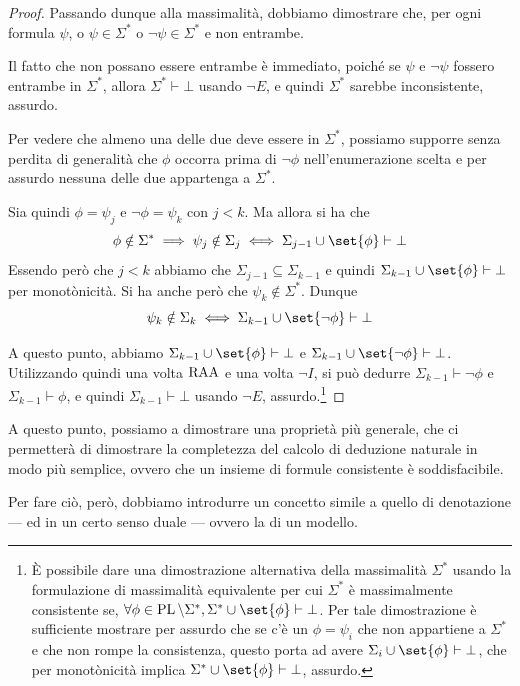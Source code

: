 \begin{proof}
  Passando dunque alla massimalità, dobbiamo dimostrare che, per ogni formula \(\psi\), o \(\psi\in\Sigma^*\) o \(\neg\psi\in\Sigma^*\) e non entrambe.

  Il fatto che non possano essere entrambe è immediato, poiché se \(\psi\) e \(\neg\psi\) fossero entrambe in \(\Sigma^*\), allora \(\Sigma^*\vdash\bot\) usando \(\neg E\), e quindi \(\Sigma^*\) sarebbe inconsistente, assurdo.

  Per vedere che almeno una delle due deve essere in \(\Sigma^*\), possiamo supporre senza perdita di generalità che \(\phi\) occorra prima di \(\neg\phi\) nell'enumerazione scelta e 
  per assurdo nessuna delle due appartenga a \(\Sigma^*\).

  Sia quindi \(\phi=\psi_j\) e \(\neg\phi=\psi_k\) con \(j<k\).
  Ma allora si ha che
  \[\phi\notin\Sigma^* \implies \psi_j \notin \Sigma_j \iff \Sigma_{j-1}\cup\set{\phi} \vdash \bot\]
  Essendo però che \(j<k\) abbiamo che \(\Sigma_{j-1}\subseteq\Sigma_{k-1}\) e quindi \(\Sigma_{k-1}\cup\set{\phi} \vdash \bot\) per monotònicità.
  Si ha anche però che \(\psi_k\notin\Sigma^*\). Dunque
  \[\psi_k \notin \Sigma_k \iff \Sigma_{k-1}\cup\set{\neg\phi}\vdash \bot\]

  A questo punto, abbiamo \(\Sigma_{k-1}\cup\set{\phi}\vdash\bot\) e \(\Sigma_{k-1}\cup\set{\neg\phi}\vdash\bot\). Utilizzando quindi una volta \(\operatorname{RAA}\) e una volta \(\neg I\), si può dedurre \(\Sigma_{k-1}\vdash\neg\phi\) e \(\Sigma_{k-1}\vdash\phi\), e quindi \(\Sigma_{k-1}\vdash\bot\) usando \(\neg E\), assurdo.\footnote{È possibile dare una dimostrazione alternativa della massimalità \(\Sigma^*\) usando la formulazione di massimalità equivalente per cui \(\Sigma^*\) è massimalmente consistente se, \(\forall \phi \in \PL\setminus\Sigma^*, \Sigma^*\cup\set{\phi}\vdash\bot\).
  Per tale dimostrazione è sufficiente mostrare per assurdo che se c'è un \(\phi=\psi_i\) che non appartiene a \(\Sigma^*\) e che non rompe la consistenza, questo porta ad avere \(\Sigma_i\cup\set{\phi}\vdash\bot\), che per monotònicità implica \(\Sigma^*\cup\set{\phi}\vdash\bot\), assurdo.}
\end{proof}

A questo punto, possiamo a dimostrare una proprietà più generale, che ci permetterà di dimostrare la completezza del calcolo di deduzione naturale in modo più semplice, ovvero che un insieme di formule consistente è soddisfacibile.

Per fare ciò, però, dobbiamo introdurre un concetto simile a quello di denotazione --- ed in un certo senso duale --- ovvero la  di un modello.


